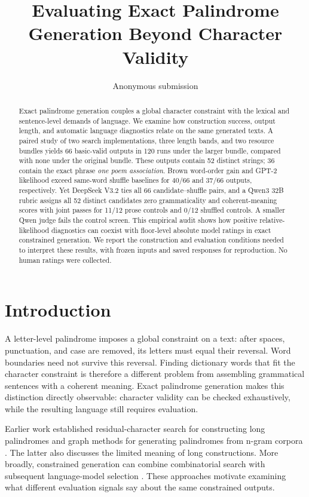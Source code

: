 \documentclass[11pt]{article}
\title{Evaluating Exact Palindrome Generation Beyond Character Validity}
\author{Anonymous submission}
\begin{document}
\maketitle

\begin{abstract}
Exact palindrome generation couples a global character constraint with the lexical and sentence-level demands of language. We examine how construction success, output length, and automatic language diagnostics relate on the same generated texts. A paired study of two search implementations, three length bands, and two resource bundles yields 66 basic-valid outputs in 120 runs under the larger bundle, compared with none under the original bundle. These outputs contain 52 distinct strings; 36 contain the exact phrase \emph{one poem association}. Brown word-order gain and GPT-2 likelihood exceed same-word shuffle baselines for 40/66 and 37/66 outputs, respectively. Yet DeepSeek V3.2 ties all 66 candidate--shuffle pairs, and a Qwen3 32B rubric assigns all 52 distinct candidates zero grammaticality and coherent-meaning scores with joint passes for 11/12 prose controls and 0/12 shuffled controls. A smaller Qwen judge fails the control screen. This empirical audit shows how positive relative-likelihood diagnostics can coexist with floor-level absolute model ratings in exact constrained generation. We report the construction and evaluation conditions needed to interpret these results, with frozen inputs and saved responses for reproduction. No human ratings were collected.
\end{abstract}

\section{Introduction}

A letter-level palindrome imposes a global constraint on a text: after spaces, punctuation, and case are removed, its letters must equal their reversal. Word boundaries need not survive this reversal. Finding dictionary words that fit the character constraint is therefore a different problem from assembling grammatical sentences with a coherent meaning. Exact palindrome generation makes this distinction directly observable: character validity can be checked exhaustively, while the resulting language still requires evaluation.

Earlier work established residual-character search for constructing long palindromes \citep{norvig2002palindrome} and graph methods for generating palindromes from n-gram corpora \citep{papadopoulos2015palindromes}. The latter also discusses the limited meaning of long constructions. More broadly, constrained generation can combine combinatorial search with subsequent language-model selection \citep{bonlarron-regin-2024}. These approaches motivate examining what different evaluation signals say about the same constrained outputs.
\end{document}
